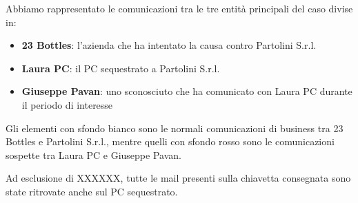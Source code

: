 Abbiamo rappresentato le comunicazioni tra le tre entità principali del caso
divise in:
\begin{itemize}
    \item \textbf{23 Bottles}: l'azienda che ha intentato la causa contro Partolini S.r.l.
    \item \textbf{Laura PC}: il PC sequestrato a Partolini S.r.l.
    \item \textbf{Giuseppe Pavan}: uno sconosciuto che ha comunicato con Laura PC durante il periodo di interesse
\end{itemize}

Gli elementi con sfondo bianco sono le normali comunicazioni 
di business tra 23 Bottles e Partolini S.r.l., mentre quelli con sfondo rosso sono 
le comunicazioni sospette tra Laura PC e Giuseppe Pavan.

Ad esclusione di XXXXXX, tutte le mail presenti sulla chiavetta consegnata
sono state ritrovate anche sul PC sequestrato.